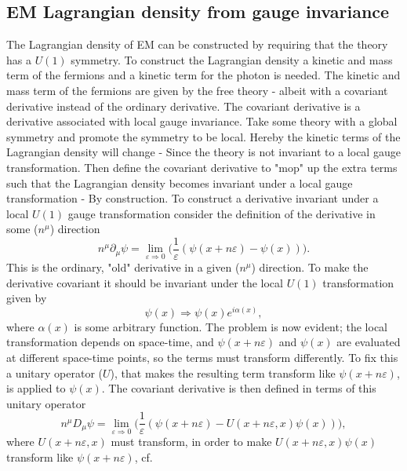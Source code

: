 \subsection*{EM Lagrangian density from gauge invariance}  
The Lagrangian density of EM can be constructed by requiring that the theory has a $U(1)$ symmetry. To construct the Lagrangian density a kinetic and mass term of the fermions and a kinetic term for the photon is needed. The kinetic and mass term of the fermions are given by the free theory - albeit with a covariant derivative instead of the ordinary derivative. The covariant derivative is a derivative associated with local gauge invariance. Take some theory with a global symmetry and promote the symmetry to be local. Hereby the kinetic terms of the Lagrangian density will change - Since the theory is not invariant to a local gauge transformation. Then define the covariant derivative to "mop" up the extra terms such that the Lagrangian density becomes invariant under a local gauge transformation - By construction. To construct a derivative invariant under a local $U(1)$ gauge transformation consider the definition of the derivative in some ($n^\mu$) direction
\begin{equation}
	n^\mu\partial_\mu \psi=\lim\limits_{\varepsilon\Rightarrow 0}\bigg(\frac{1}{\varepsilon}(\psi(x+n\varepsilon)-\psi(x))\bigg).
\end{equation} 
This is the ordinary, "old" derivative in a given ($n^\mu$) direction. To make the derivative covariant it should be invariant under the local $U(1)$ transformation given by
\begin{equation}
	\psi(x)\Rightarrow \psi(x)e^{i\alpha(x)},
\end{equation} 
where $\alpha(x)$ is some arbitrary function. The problem is now evident; the local transformation depends on space-time, and $\psi(x+n\varepsilon)$ and $\psi(x)$ are evaluated at different space-time points, so the terms must transform differently. To fix this a unitary operator ($U$), that makes the resulting term transform like $\psi(x+n\varepsilon)$, is applied to $\psi(x)$. The covariant derivative is then defined in terms of this unitary operator
\begin{equation}
	n^\mu D_\mu \psi=\lim\limits_{\varepsilon\Rightarrow 0}\bigg(\frac{1}{\varepsilon}(\psi(x+n\varepsilon)-U(x+n\varepsilon,x)\psi(x))\bigg),
	\label{cov}
\end{equation} 
where $U(x+n\varepsilon,x)$ must transform, in order to make $U(x+n\varepsilon,x)\psi(x)$ transform like $\psi(x+n\varepsilon)$, cf.
